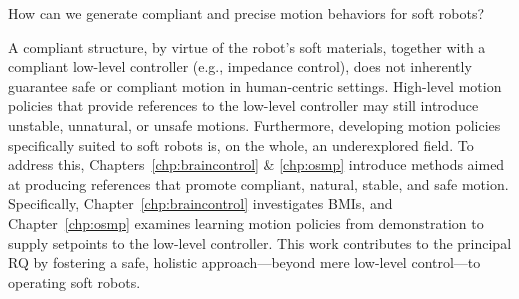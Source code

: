 \begin{researchquestion}\label{rq:compliant_motion_behaviors}
    How can we generate compliant and precise motion behaviors for soft robots?
\end{researchquestion}
A compliant structure, by virtue of the robot’s soft materials, together with a compliant low-level controller (e.g., impedance control), does not inherently guarantee safe or compliant motion in human-centric settings. High-level motion policies that provide references to the low-level controller may still introduce unstable, unnatural, or unsafe motions. Furthermore, developing motion policies specifically suited to soft robots is, on the whole, an underexplored field.
%
To address this, Chapters~\ref{chp:braincontrol} \& \ref{chp:osmp} introduce methods aimed at producing references that promote compliant, natural, stable, and safe motion. Specifically, Chapter~\ref{chp:braincontrol} investigates \glspl{BMI}, and Chapter~\ref{chp:osmp} examines learning motion policies from demonstration to supply setpoints to the low-level controller. This work contributes to the principal \gls{RQ} by fostering a safe, holistic approach—beyond mere low-level control—to operating soft robots.
